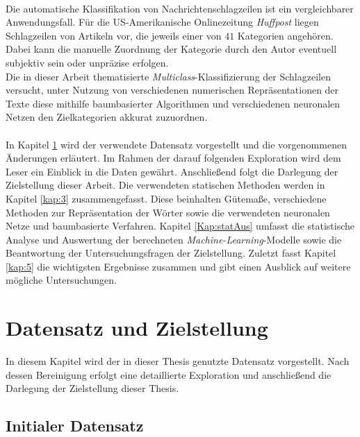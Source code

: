 \documentclass[a4paper,11pt]{article}
\begin{document}
\\
Die automatische Klassifikation von Nachrichtenschlagzeilen ist ein vergleichbarer Anwendungsfall. Für die US-Amerikanische Onlinezeitung \textit{Huffpost} liegen Schlagzeilen von Artikeln vor, die jeweils einer von $41$ Kategorien angehören. Dabei kann die manuelle Zuordnung der Kategorie durch den Autor eventuell subjektiv sein oder unpräzise erfolgen. \\
Die in dieser Arbeit thematisierte \textit{Multiclass}-Klassifizierung der Schlagzeilen versucht, unter Nutzung von verschiedenen numerischen Repräsentationen der Texte diese mithilfe baumbasierter Algorithmen und verschiedenen neuronalen Netzen den Zielkategorien akkurat zuzuordnen.\\
\\
In Kapitel \ref{kap:2} wird der verwendete Datensatz vorgestellt und die vorgenommenen Änderungen erläutert. Im Rahmen der darauf folgenden Exploration wird dem Leser ein Einblick in die Daten gewährt.
Anschließend folgt die Darlegung der Zielstellung dieser Arbeit. Die verwendeten statischen Methoden werden in Kapitel \ref{kap:3} zusammengefasst. Diese beinhalten Gütemaße, verschiedene Methoden zur Repräsentation der Wörter sowie die verwendeten neuronalen Netze und baumbasierte Verfahren. Kapitel \ref{Kap:statAus} umfasst die statistische Analyse und Auswertung der berechneten \textit{Machine-Learning}-Modelle sowie die Beantwortung der Untersuchungsfragen der Zielstellung. Zuletzt fasst Kapitel \ref{kap:5} die wichtigsten Ergebnisse zusammen und gibt einen Ausblick auf weitere mögliche Untersuchungen.

\newpage

\section{Datensatz und Zielstellung}\label{kap:2}

In diesem Kapitel wird der in dieser Thesis genutzte Datensatz vorgestellt. Nach dessen Bereinigung erfolgt eine detaillierte Exploration und anschließend die Darlegung der Zielstellung dieser Thesis.


\subsection{Initialer Datensatz}
\end{document}
